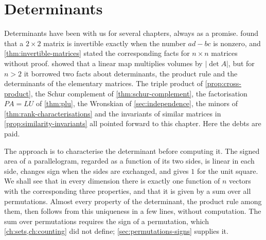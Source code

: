 \chapter{Determinants}
\label{ch:determinants}


Determinants have been with us for several chapters, always as a promise.  found that a $2\times2$ matrix is invertible exactly when the number $ad-bc$ is nonzero, and \cref{thm:invertible-matrices} stated the corresponding facts for $n\times n$ matrices without proof.  showed that a linear map multiplies volumes by $|\det A|$, but for $n>2$ it borrowed two facts about determinants, the product rule and the determinants of the elementary matrices. The triple product of \cref{prop:cross-product}, the Schur complement of \cref{thm:schur-complement}, the factorisation $PA=LU$ of \cref{thm:plu}, the Wronskian of \cref{sec:independence}, the minors of \cref{thm:rank-characterisations} and the invariants of similar matrices in \cref{prop:similarity-invariants} all pointed forward to this chapter. Here the debts are paid.

The approach is to characterise the determinant before computing it. The signed area of a parallelogram, regarded as a function of its two sides, is linear in each side, changes sign when the sides are exchanged, and gives $1$ for the unit square. We shall see that in every dimension there is exactly one function of $n$ vectors with the corresponding three properties, and that it is given by a sum over all permutations. Almost every property of the determinant, the product rule among them, then follows from this uniqueness in a few lines, without computation. The sum over permutations requires the sign of a permutation, which \cref{ch:sets,ch:counting} did not define; \cref{sec:permutations-signs} supplies it.

